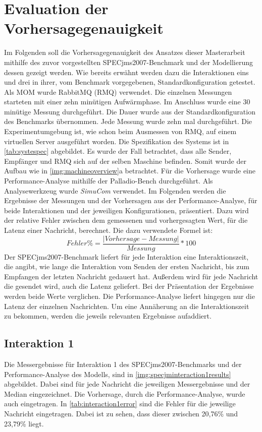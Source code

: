 \section{Evaluation der Vorhersagegenauigkeit}
\label{sec:specjmsmodellvorhersage}
Im Folgenden soll die Vorhersagegenauigkeit des Ansatzes dieser Masterarbeit mithilfe des zuvor vorgestellten SPECjms2007-Benchmark und der Modellierung dessen gezeigt werden. Wie bereits erwähnt werden dazu die Interaktionen eins und drei in ihrer, vom Benchmark vorgegebenen, Standardkonfiguration getestet. Als MOM wurde RabbitMQ (RMQ) verwendet. Die einzelnen Messungen starteten mit einer zehn minütigen Aufwärmphase. Im Anschluss wurde eine 30 minütige Messung durchgeführt. Die Dauer wurde aus der Standardkonfiguration des Benchmarks übernommen. Jede Messung wurde zehn mal durchgeführt. Die Experimentumgebung ist, wie schon beim Ausmessen von RMQ, auf einem virtuellen Server ausgeführt worden. Die Spezifikation des Systems ist in \autoref{tab:systespec} abgebildet. Es wurde der Fall betrachtet, dass alle Sender, Empfänger und RMQ sich auf der selben Maschine befinden. Somit wurde der Aufbau wie in \autoref{img:machineoverview}a betrachtet. Für die Vorhersage wurde eine Performance-Analyse mithilfe der Palladio-Bench durchgeführt. Als Analysewerkzeug wurde \emph{SimuCom} verwendet. Im Folgenden werden die Ergebnisse der Messungen und der Vorhersagen aus der Performance-Analyse, für beide Interaktionen und der jeweiligen Konfigurationen, präsentiert. Dazu wird der relative Fehler zwischen dem gemessenen und vorhergesagten Wert, für die Latenz einer Nachricht, berechnet. Die dazu verwendete Formel ist:
\[ Fehler\% = \frac{|Vorhersage - Messung|}{Messung} * 100 \]
Der SPECjms2007-Benchmark liefert für jede Interaktion eine Interaktionszeit, die angibt, wie lange die Interaktion vom Senden der ersten Nachricht, bis zum Empfangen der letzten Nachricht gedauert hat. Außerdem wird für jede Nachricht die gesendet wird, auch die Latenz geliefert. Bei der Präsentation der Ergebnisse werden beide Werte verglichen. Die Performance-Analyse liefert hingegen nur die Latenz der einzelnen Nachrichten. Um eine Annäherung an die Interaktionszeit zu bekommen, werden die jeweils relevanten Ergebnisse aufaddiert.
\subsection{Interaktion 1}
Die Messergebnisse für Interaktion 1 des SPECjms2007-Benchmarks und der Perfor\-mance-Analyse des Modells, sind in \autoref{img:specjminteraction1results} abgebildet. Dabei sind für jede Nachricht die jeweiligen Messergebnisse und der Median eingezeichnet. Die Vorhersage, durch die Performance-Analyse, wurde auch eingetragen. In \autoref{tab:interaction1error} sind die Fehler für die jeweilige Nachricht eingetragen. Dabei ist zu sehen, dass dieser zwischen 20,76\% und 23,79\% liegt. 

